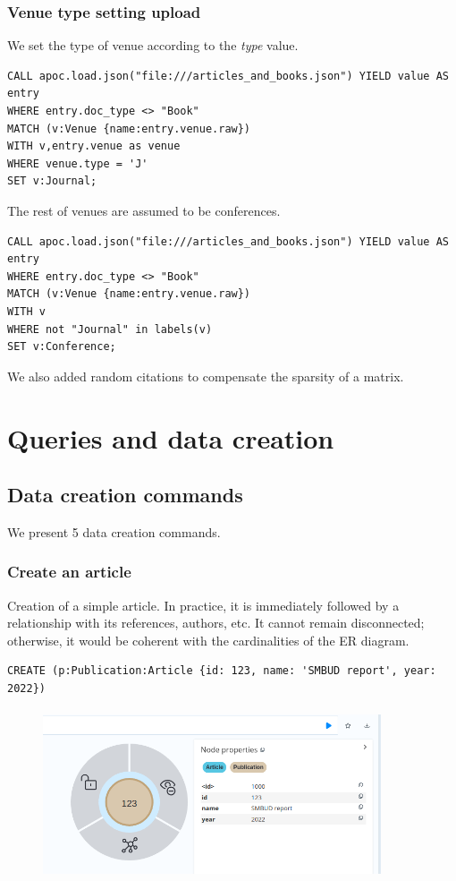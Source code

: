 \documentclass{Configuration_Files/PoliMi3i_thesis}
\begin{document}
\subsection{Venue type setting upload}
We set the type of venue according to the \textit{type} value. \\
\begin{lstlisting}[language=cypher, label=lst:cypher-example]
CALL apoc.load.json("file:///articles_and_books.json") YIELD value AS 
entry
WHERE entry.doc_type <> "Book"
MATCH (v:Venue {name:entry.venue.raw})
WITH v,entry.venue as venue
WHERE venue.type = 'J'
SET v:Journal;
\end{lstlisting}
The rest of venues are assumed to be conferences.
\begin{lstlisting}[language=cypher, label=lst:cypher-example]
CALL apoc.load.json("file:///articles_and_books.json") YIELD value AS 
entry
WHERE entry.doc_type <> "Book"
MATCH (v:Venue {name:entry.venue.raw})
WITH v
WHERE not "Journal" in labels(v)
SET v:Conference;
\end{lstlisting}
We also added random citations to compensate the sparsity of a matrix.
\chapter{Queries and data creation}
\label{ch:chapter_one}%
\section{Data creation commands}
We present 5 data creation commands.
\subsection{Create an article}
Creation of a simple article. In practice, it is immediately followed by a relationship with its references, authors, etc. It cannot remain disconnected; otherwise, it would be coherent with the cardinalities of the ER diagram.
\\
\begin{lstlisting}[language=cypher, label=lst:cypher-example]
CREATE (p:Publication:Article {id: 123, name: 'SMBUD report', year: 2022})
\end{lstlisting}
\begin{figure}[H]
    \centering
    \includegraphics[width=100mm, height=50mm]{Images/create_1.png}
    \caption{}
    \label{fig:quadtree}
\end{figure}
\end{document}
